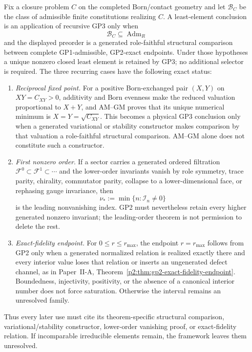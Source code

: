 \documentclass[12pt,a4paper]{article}
\begin{document}
\begin{theorem}
\label{p3:thm:D1-universal-constitution}
\label{p3:thm:D1-gp2-constitution-rule}
Fix a closure problem \(C\) on the completed Born/contact geometry and let
\(\mathcal B_C\) be the class of admissible finite constitutions realizing
\(C\).  A least-element conclusion is an application of recursive GP3 only
when
\[
 \mathcal B_C\subseteq\operatorname{Adm}_R
\]
and the displayed preorder is a generated role-faithful structural
comparison between complete GP1-admissible, GP2-exact endpoints.  Under those
hypotheses a unique nonzero closed least element is retained by GP3; no
additional selector is required.  The three recurring cases have the
following exact status:
\begin{enumerate}[label=(\roman*),leftmargin=2.2em]
\item \emph{Reciprocal fixed point.}  For a positive Born-exchanged pair
\((X,Y)\) on \(XY=C_{XY}>0\), additivity and Born evenness make the reduced
valuation proportional to \(X+Y\), and AM--GM proves that its unique numerical
minimum is \(X=Y=\sqrt{C_{XY}}\).  This becomes a physical GP3 conclusion
only when a generated variational or stability constructor makes comparison
by that valuation a role-faithful structural comparison.  AM--GM alone does
not constitute such a constructor.
\item \emph{First nonzero order.}  If a sector carries a generated ordered
filtration \(\mathcal F^0\subset\mathcal F^1\subset\cdots\) and the lower-order
invariants vanish by role symmetry, trace parity, chirality,
commutator parity, collapse to a lower-dimensional face, or rephasing gauge
invariance, then
\[
        \nu_*:=\min\{n:\mathcal I_n\ne0\}
\]
is the leading nonvanishing index.  GP2 must nevertheless retain every higher
generated nonzero invariant; the leading-order theorem is not permission to
delete the rest.
\item \emph{Exact-fidelity endpoint.}  For
\(0\le r\le r_{\max}\), the endpoint \(r=r_{\max}\) follows from GP2 only
when a generated normalized relation is realized exactly there and every
interior value loses that relation or inserts an ungenerated defect channel,
as in Paper~II-A,
Theorem~\ref{p2:thm:gp2-exact-fidelity-endpoint}.  Boundedness, injectivity,
positivity, or the absence of a canonical interior number does not force
saturation.  Otherwise the interval remains an unresolved family.
\end{enumerate}
Thus every later use must cite its theorem-specific structural comparison,
variational/stability constructor, lower-order vanishing proof, or
exact-fidelity relation.  If incomparable irreducible elements remain, the
framework leaves them unresolved.
\end{theorem}
\end{document}
